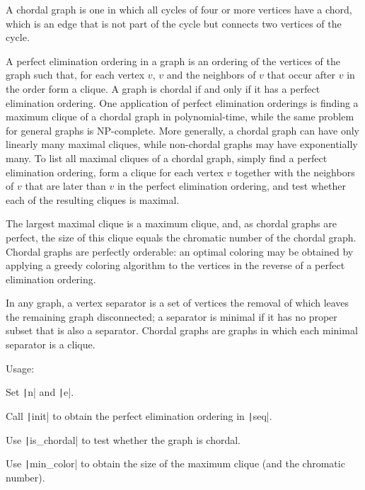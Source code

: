 A chordal graph is one in which all cycles of four or more vertices have a chord, which is an edge that is not part of the cycle but connects two vertices of the cycle.

A perfect elimination ordering in a graph is an ordering of the vertices of the graph such that, for each vertex $v$, $v$ and the neighbors of $v$ that occur after $v$ in the order form a clique. A graph is chordal if and only if it has a perfect elimination ordering. One application of perfect elimination orderings is finding a maximum clique of a chordal graph in polynomial-time, while the same problem for general graphs is NP-complete. More generally, a chordal graph can have only linearly many maximal cliques, while non-chordal graphs may have exponentially many. To list all maximal cliques of a chordal graph, simply find a perfect elimination ordering, form a clique for each vertex $v$ together with the neighbors of $v$ that are later than $v$ in the perfect elimination ordering, and test whether each of the resulting cliques is maximal.

The largest maximal clique is a maximum clique, and, as chordal graphs are perfect, the size of this clique equals the chromatic number of the chordal graph. Chordal graphs are perfectly orderable: an optimal coloring may be obtained by applying a greedy coloring algorithm to the vertices in the reverse of a perfect elimination ordering.

In any graph, a vertex separator is a set of vertices the removal of which leaves the remaining graph disconnected; a separator is minimal if it has no proper subset that is also a separator. Chordal graphs are graphs in which each minimal separator is a clique.

Usage:
\begin{compactenum}
  \item Set \texttt|n| and \texttt|e|.
  \item Call \texttt|init| to obtain the perfect elimination ordering in \texttt|seq|.
  \item Use \texttt|is_chordal| to test whether the graph is chordal.
  \item Use \texttt|min_color| to obtain the size of the maximum clique (and the chromatic number).
\end{compactenum}

\inputminted{cpp}{src/graph/characteristic/chordal-graph.cpp.com}
